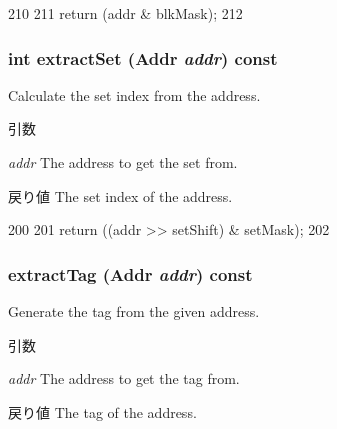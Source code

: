 \begin{DoxyCode}
210     {
211         return (addr & blkMask);
212     }
\end{DoxyCode}
\hypertarget{classLRU_a8fdcc1372cb0a5d8e1933bdb0bf7d680}{
\subsubsection[{extractSet}]{\setlength{\rightskip}{0pt plus 5cm}int extractSet ({\bf Addr} {\em addr}) const}}
\label{classLRU_a8fdcc1372cb0a5d8e1933bdb0bf7d680}
Calculate the set index from the address. 
\begin{DoxyParams}{引数}
\item[{\em addr}]The address to get the set from. \end{DoxyParams}
\begin{DoxyReturn}{戻り値}
The set index of the address. 
\end{DoxyReturn}



\begin{DoxyCode}
200     {
201         return ((addr >> setShift) & setMask);
202     }
\end{DoxyCode}
\hypertarget{classLRU_a3a855eb5b0d8adbf737f25baa15a3d7b}{
\subsubsection[{extractTag}]{ extractTag ({\bf Addr} {\em addr}) const}}
\label{classLRU_a3a855eb5b0d8adbf737f25baa15a3d7b}
Generate the tag from the given address. 
\begin{DoxyParams}{引数}
\item[{\em addr}]The address to get the tag from. \end{DoxyParams}
\begin{DoxyReturn}{戻り値}
The tag of the address. 
\end{DoxyReturn}



